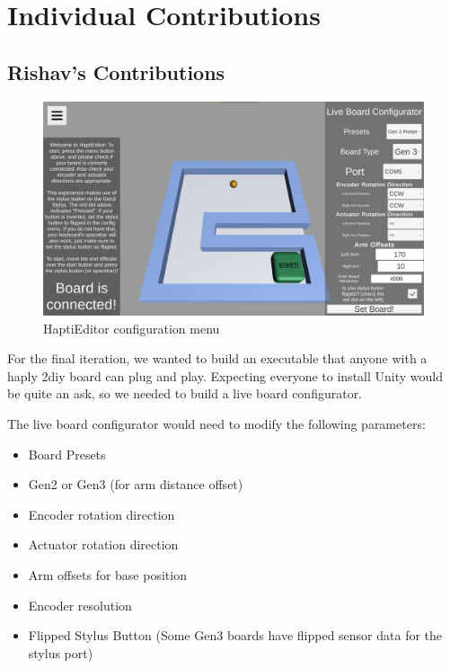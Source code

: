 \appendix

\section{Individual Contributions}

\subsection{Rishav's Contributions}

\begin{figure}[htp]
    \centering
    \includegraphics[width=14cm]{images/appendix-menu.png}
    \caption{HaptiEditor configuration menu}
    \label{fig:menu}
\end{figure}

For the final iteration, we wanted to build an executable that anyone with a haply 2diy board can plug and play. Expecting everyone to install Unity would be quite an ask, so we needed to build a live board configurator.

The live board configurator would need to modify the following parameters:
\begin{itemize}
    \item Board Presets
    \item Gen2 or Gen3 (for arm distance offset)
    \item Encoder rotation direction
    \item Actuator rotation direction
    \item Arm offsets for base position
    \item Encoder resolution
    \item Flipped Stylus Button (Some Gen3 boards have flipped sensor data for the stylus port)
\end{itemize}

